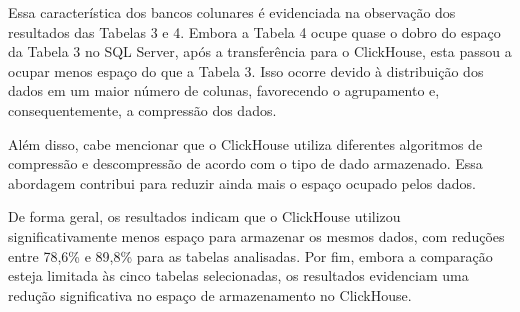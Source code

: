Essa característica dos bancos colunares é evidenciada na observação dos resultados das Tabelas 3
e 4. Embora a Tabela 4 ocupe quase o dobro do espaço da Tabela 3 no SQL Server, após a
transferência para o ClickHouse, esta passou a ocupar menos espaço do que a Tabela 3.
Isso ocorre devido à distribuição dos dados em um maior número de colunas, favorecendo o agrupamento e,
consequentemente, a compressão dos dados.

Além disso, cabe mencionar que o ClickHouse utiliza diferentes algoritmos de compressão e descompressão
de acordo com o tipo de dado armazenado. Essa abordagem contribui para reduzir ainda mais o espaço 
ocupado pelos dados.

De forma geral, os resultados indicam que o ClickHouse utilizou significativamente menos espaço para 
armazenar os mesmos dados, com reduções entre 78,6\% e 89,8\% para as tabelas analisadas. Por fim, embora 
a comparação esteja limitada às cinco tabelas selecionadas, os resultados evidenciam uma redução
significativa no espaço de armazenamento no ClickHouse.

